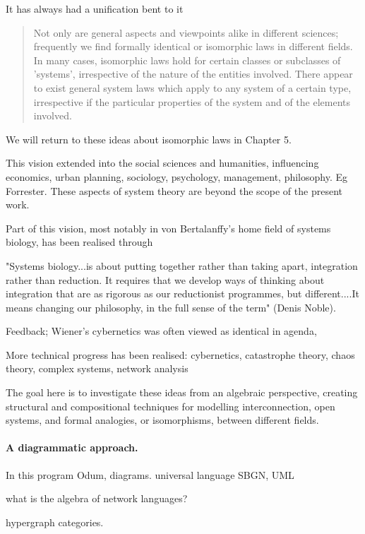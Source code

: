 It has always had a unification bent to it \cite{Ber50}

\begin{quotation}
  Not only are general aspects and viewpoints alike in different sciences;
  frequently we find formally identical or isomorphic laws in different fields.
  In many cases, isomorphic laws hold for certain classes or subclasses of
  'systems', irrespective of the nature of the entities involved. There appear
  to exist general system laws which apply to any system of a certain type,
  irrespective if the particular properties of the system and of the elements
  involved.
\end{quotation}
We will return to these ideas about isomorphic laws in Chapter 5.

This vision extended into the social sciences and humanities, influencing
economics, urban planning, sociology, psychology, management, philosophy. Eg
Forrester. These aspects of system theory are beyond the scope of the present
work.

Part of this vision, most notably in von Bertalanffy's home field of
systems biology, has been realised through 


    "Systems biology...is about putting together rather than taking apart, integration rather than reduction. It requires that we develop ways of thinking about integration that are as rigorous as our reductionist programmes, but different....It means changing our philosophy, in the full sense of the term" (Denis Noble).

Feedback; Wiener's cybernetics was often viewed as identical in agenda, 

More technical progress has been realised: cybernetics, catastrophe theory,
chaos theory, complex systems, network analysis

The goal here is to investigate these ideas from an algebraic perspective,
creating structural and compositional techniques for modelling
interconnection, open systems, and formal analogies, or isomorphisms, between
different fields.

\paragraph{A diagrammatic approach.}

In this program Odum, diagrams. universal language SBGN, UML

what is the algebra of network languages?

hypergraph categories.

